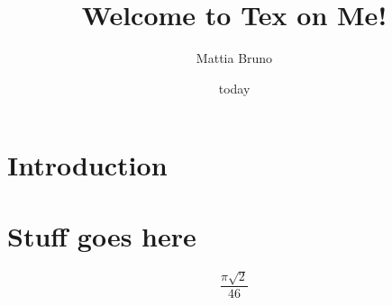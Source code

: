 \documentclass[a4paper]{article}
\title{Welcome to Tex on Me!}
\author{Mattia Bruno}
\date{today}
\begin{document}
\maketitle

\section{Introduction}

\section{Stuff goes here}    

\begin{equation}
    \frac{\pi \sqrt{2}}{46}
\end{equation}
\end{document}
